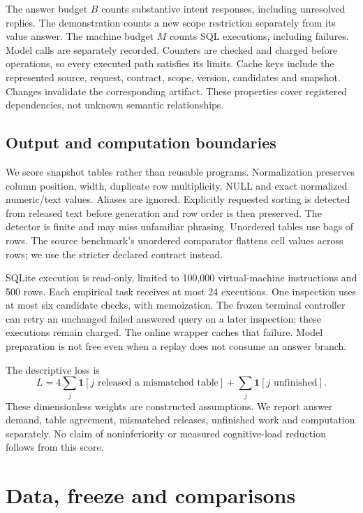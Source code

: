 \documentclass[11pt]{article}
\begin{document}
The answer budget $B$ counts substantive intent responses, including unresolved replies. The demonstration counts a new scope restriction separately from its value answer. The machine budget $M$ counts SQL executions, including failures. Model calls are separately recorded. Counters are checked and charged before operations, so every executed path satisfies its limits. Cache keys include the represented source, request, contract, scope, version, candidates and snapshot. Changes invalidate the corresponding artifact. These properties cover registered dependencies, not unknown semantic relationships.

\subsection{Output and computation boundaries}
We score snapshot tables rather than reusable programs. Normalization preserves column position, width, duplicate row multiplicity, NULL and exact normalized numeric/text values. Aliases are ignored. Explicitly requested sorting is detected from released text before generation and row order is then preserved. The detector is finite and may miss unfamiliar phrasing. Unordered tables use bags of rows. The source benchmark's unordered comparator flattens cell values across rows; we use the stricter declared contract instead.

SQLite execution is read-only, limited to 100,000 virtual-machine instructions and 500 rows. Each empirical task receives at most 24 executions. One inspection uses at most six candidate checks, with memoization. The frozen terminal controller can retry an unchanged failed answered query on a later inspection; these executions remain charged. The online wrapper caches that failure. Model preparation is not free even when a replay does not consume an answer branch.

The descriptive loss is
\begin{equation}
 L=4\sum_j \mathbf{1}[j\text{ released a mismatched table}]
   +\sum_j \mathbf{1}[j\text{ unfinished}].
\end{equation}
These dimensionless weights are constructed assumptions. We report answer demand, table agreement, mismatched releases, unfinished work and computation separately. No claim of noninferiority or measured cognitive-load reduction follows from this score.

\section{Data, freeze and comparisons}
\end{document}
